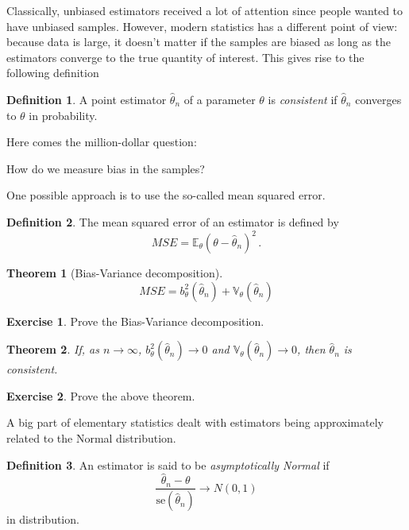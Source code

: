\documentclass[
  openany]{book}
\newtheorem{theorem}{Theorem}[chapter]
\theoremstyle{definition}
\newtheorem{definition}{Definition}[chapter]
\theoremstyle{definition}
\theoremstyle{definition}
\newtheorem{exercise}{Exercise}[chapter]
\theoremstyle{definition}
\theoremstyle{remark}
\begin{document}
Classically, unbiased estimators received a lot of attention since people
wanted to have unbiased samples.
However, modern statistics has a different point of view: because data
is large, it doesn't matter if the samples are biased as long as the
estimators converge to the true quantity of interest.
This gives rise to the following definition

\begin{definition}
A point estimator \(\hat \theta_n\) of a parameter \(\theta\) is \emph{consistent}
if \(\hat \theta_n\) converges to \(\theta\) in probability.
\end{definition}

Here comes the million-dollar question:

\begin{bbox}

How do we measure bias in the samples?

\end{bbox}

One possible approach is to use the so-called mean squared error.

\begin{definition}
The mean squared error of an estimator is defined by
\[ MSE = \mathbb{E}_\theta (\theta - \hat \theta_n)^2 \,.\]
\end{definition}

\begin{theorem}[Bias-Variance decomposition]
\[ MSE = b_\theta^2(\hat \theta_n) + \mathbb{V}_\theta(\hat \theta_n) \]
\end{theorem}

\begin{exercise}
Prove the Bias-Variance decomposition.
\end{exercise}

\begin{theorem}
If, as \(n\to \infty\),
\(b_\theta^2(\hat \theta_n) \to 0\) and \(\mathbb{V}_\theta(\hat \theta_n) \to 0\),
then \(\hat\theta_n\) is consistent.
\end{theorem}

\begin{exercise}
Prove the above theorem.
\end{exercise}

A big part of elementary statistics dealt with estimators being approximately
related to the Normal distribution.

\begin{definition}
An estimator is said to be \emph{asymptotically Normal} if
\[ \frac{\hat \theta_n - \theta}{\mathrm{se}(\hat \theta_n)} \to N(0,1) \]
in distribution.
\end{definition}
\end{document}
